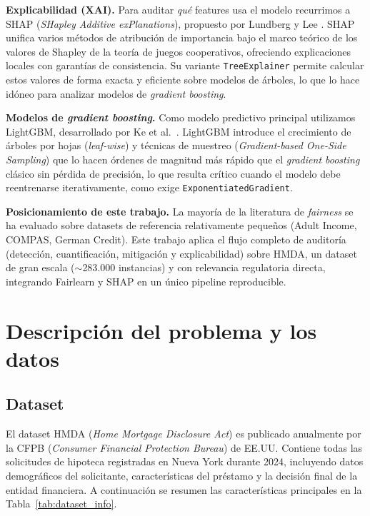 \documentclass[11pt,a4paper]{article}
\begin{document}
\textbf{Explicabilidad (XAI).} Para auditar \textit{qué} features usa el modelo recurrimos a SHAP
(\textit{SHapley Additive exPlanations}), propuesto por Lundberg y Lee \cite{lundberg2017}. SHAP
unifica varios métodos de atribución de importancia bajo el marco teórico de los valores de Shapley
de la teoría de juegos cooperativos, ofreciendo explicaciones locales con garantías de consistencia.
Su variante \texttt{TreeExplainer} permite calcular estos valores de forma exacta y eficiente sobre
modelos de árboles, lo que lo hace idóneo para analizar modelos de \textit{gradient boosting}.

\textbf{Modelos de \textit{gradient boosting}.} Como modelo predictivo principal utilizamos LightGBM,
desarrollado por Ke et al.\ \cite{ke2017}. LightGBM introduce el crecimiento de árboles por hojas
(\textit{leaf-wise}) y técnicas de muestreo (\textit{Gradient-based One-Side Sampling}) que lo hacen
órdenes de magnitud más rápido que el \textit{gradient boosting} clásico sin pérdida de precisión,
lo que resulta crítico cuando el modelo debe reentrenarse iterativamente, como exige
\texttt{ExponentiatedGradient}.

\textbf{Posicionamiento de este trabajo.} La mayoría de la literatura de \textit{fairness} se ha
evaluado sobre datasets de referencia relativamente pequeños (Adult Income, COMPAS, German Credit).
Este trabajo aplica el flujo completo de auditoría (detección, cuantificación, mitigación y
explicabilidad) sobre HMDA, un dataset de gran escala ($\sim$283.000 instancias) y con relevancia
regulatoria directa, integrando Fairlearn y SHAP en un único pipeline reproducible.

\section{Descripción del problema y los datos}
\label{sec:datos}

\subsection{Dataset}

El dataset HMDA (\textit{Home Mortgage Disclosure Act}) es publicado anualmente por la CFPB
(\textit{Consumer Financial Protection Bureau}) de EE.UU. Contiene todas las solicitudes de hipoteca
registradas en Nueva York durante 2024, incluyendo datos demográficos del solicitante, características
del préstamo y la decisión final de la entidad financiera. A continuación se resumen las
características principales en la Tabla~\ref{tab:dataset_info}.
\end{document}
